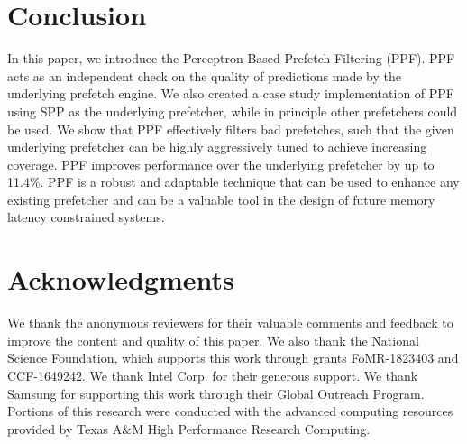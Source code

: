 \section{Conclusion}
\label{Conclusion}
In this paper, we introduce the Perceptron-Based Prefetch Filtering
(PPF).  PPF acts as an independent check on the quality of predictions
made by the underlying prefetch engine.  We also created a case study
implementation of PPF using SPP as the underlying prefetcher, while
in principle other prefetchers could be used.  We show that PPF
effectively filters bad prefetches, such that the given underlying
prefetcher can be highly aggressively tuned to achieve increasing
coverage.  PPF improves performance over the underlying 
prefetcher by up to 11.4\%.  PPF is a robust and adaptable technique 
that can be used to enhance any existing prefetcher and can be a 
valuable tool in the design of future memory latency constrained systems.

\section{Acknowledgments}

We thank the anonymous reviewers for their valuable comments and feedback to
improve the content and quality of this paper.  We also thank the National
Science Foundation, which supports this work through grants FoMR-1823403 and
CCF-1649242.  We thank Intel Corp. for their generous support. We thank
Samsung for supporting this work through their Global Outreach Program.
Portions of this research were conducted with the advanced computing resources provided by Texas A\&M High Performance Research Computing.
